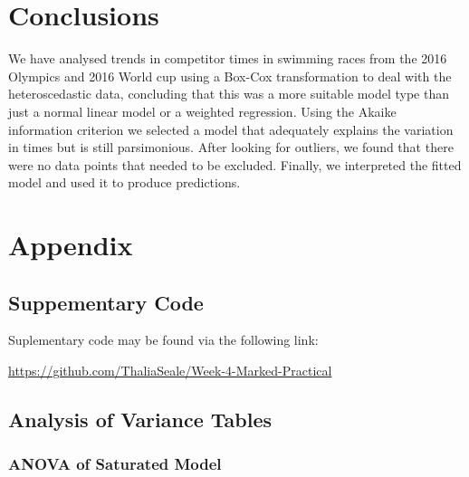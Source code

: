 \documentclass[a4paper,11pt]{article}
\begin{document}
\section{Conclusions}

We have analysed trends in competitor times in swimming races from the 2016 Olympics and 2016 World cup using a Box-Cox transformation to deal with the heteroscedastic data, concluding that this was a more suitable model type than just a normal linear model or a weighted regression. Using the Akaike information criterion we selected a model that adequately explains the variation in times but is still parsimonious. After looking for outliers, we found that there were no data points that needed to be excluded. Finally, we interpreted the fitted model and used it to produce predictions.

\section{Appendix}

\subsection{Suppementary Code}

Suplementary code may be found via the following link:

\url{https://github.com/ThaliaSeale/Week-4-Marked-Practical}

\subsection{Analysis of Variance Tables} \label{ANOVA}

\subsubsection{ANOVA of Saturated Model}
\end{document}
